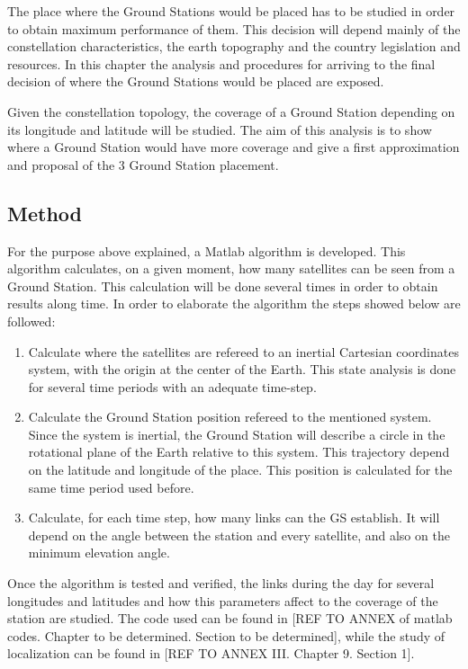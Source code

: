 The place where the Ground Stations would be placed has to be studied in order to obtain maximum performance of them. This decision will depend mainly of the constellation characteristics, the earth topography and the country legislation and resources. In this chapter the analysis and procedures for arriving to the final decision of where the Ground Stations would be placed are exposed.

Given the constellation topology, the coverage of a Ground Station depending on its longitude and latitude will be studied. The aim of this analysis is to show where a Ground Station would have more coverage and give a first approximation and proposal of the 3 Ground Station placement.

\subsection{Method}
For the purpose above explained, a Matlab algorithm is developed. This algorithm calculates, on a given moment, how many satellites can be seen from a Ground Station. This calculation will be done several times in order to obtain results along time. In order to elaborate the algorithm the steps showed below are followed:
\begin{enumerate}
\item Calculate where the satellites are refereed to an inertial Cartesian coordinates system, with the origin at the center of the Earth. This state analysis is done for several time periods with an adequate time-step. 
\item Calculate the Ground Station position refereed to the mentioned system. Since the system is inertial, the Ground Station will describe a circle in the rotational plane of the Earth relative to this system. This trajectory depend on the latitude and longitude of the place. This position is calculated for the same time period used before.
\item Calculate, for each time step, how many links can the GS establish. It will depend on the angle between the station and every satellite, and also on the minimum elevation angle. 
\end{enumerate}

Once the algorithm is tested and verified, the links during the day for several longitudes and latitudes and how this parameters affect to the coverage of the station are studied. The code used can be found in [{REF TO ANNEX of matlab codes. Chapter to be determined. Section to be determined}], while the study of localization can be found in [{REF TO ANNEX III. Chapter 9. Section 1}].

